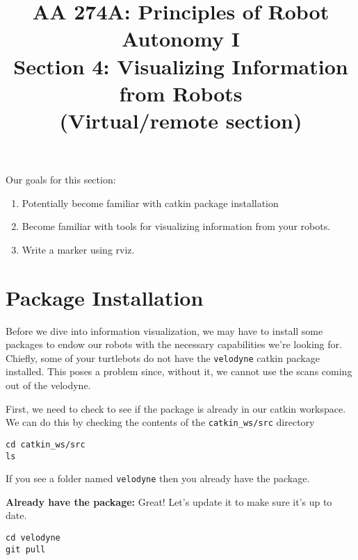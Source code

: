 \documentclass{article}
\title{AA 274A: Principles of Robot Autonomy I \\ Section 4: Visualizing Information from Robots \\
(Virtual/remote section)}
\date{}
\begin{document}
\maketitle
\pagestyle{fancy}

Our goals for this section: \begin{enumerate}
	\item Potentially become familiar with catkin package installation
    \item Become familiar with tools for visualizing information from your robots.
    \item Write a marker using rviz.
\end{enumerate}

\section{Package Installation}

Before we dive into information visualization, we may have to install some packages to endow our robots with the necessary capabilities we're looking for. Chiefly, some of your turtlebots do not have the \texttt{velodyne} catkin package installed. This poses a problem since, without it, we cannot use the scans coming out of the velodyne.



First, we need to check to see if the package is already in our catkin workspace. We can do this by checking the contents of the \texttt{catkin\_ws/src} directory
\begin{lstlisting}
cd catkin_ws/src
ls
\end{lstlisting}
If you see a folder named \texttt{velodyne} then you already have the package.

{\bf Already have the package:} Great! Let's update it to make sure it's up to date.
\begin{lstlisting}
cd velodyne
git pull
\end{lstlisting}
\end{document}
